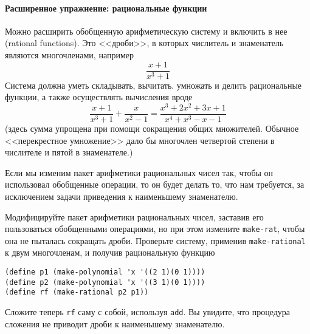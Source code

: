 \paragraph{Расширенное упражнение: рациональные функции}

Можно расширить обобщенную арифметическую систему и
включить в нее  
 (rational functions).  Это <<дроби>>, в которых числитель и знаменатель
являются многочленами, например
$$
\frac{x+1}{x^3+1}
$$
Система должна уметь складывать, вычитать. умножать и делить
рациональные функции, а также осуществлять вычисления вроде
$$
\frac{x+1}{x^3+1} + \frac{x}{x^2-1} 
  = \frac{x^3 + 2x^2 + 3x + 1}{x^4 + x^3 - x - 1}
$$
(здесь сумма упрощена при помощи сокращения общих множителей.  Обычное
<<перекрестное умножение>> дало бы многочлен четвертой степени в
числителе и пятой в знаменателе.)

Если мы изменим пакет арифметики рациональных чисел так,
чтобы он использовал обобщенные операции, то он будет делать то, что
нам требуется, за исключением задачи приведения к наименьшему знаменателю.
\begin{exercise}{2.93}\label{EX2.93}%
Модифицируйте пакет арифметики рациональных чисел,
заставив его пользоваться обобщенными операциями, но при этом измените
{\tt make-rat}, чтобы она не пыталась сокращать дроби.
Проверьте систему, применив {\tt make-rational} к двум
многочленам, и получив рациональную функцию

\begin{Verbatim}[fontsize=\small]
(define p1 (make-polynomial 'x '((2 1)(0 1))))
(define p2 (make-polynomial 'x '((3 1)(0 1))))
(define rf (make-rational p2 p1))
\end{Verbatim}
Сложите теперь {\tt rf} саму с собой, используя
{\tt add}.  Вы увидите, что процедура сложения не приводит
дроби к наименьшему знаменателю.
\end{exercise}

\medskip

